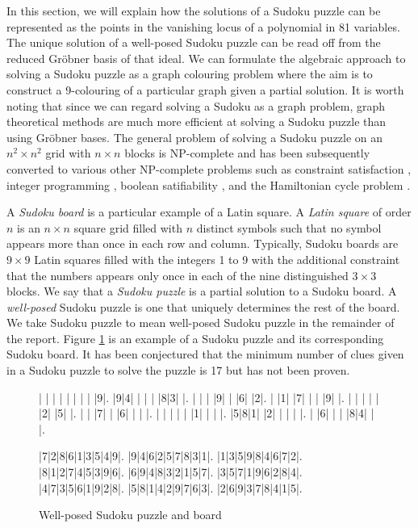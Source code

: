 \documentclass[../main.tex]{subfiles}
\begin{document}
    
    
    In this section, we will explain how the solutions of a Sudoku puzzle can be represented as the points in the vanishing locus of a polynomial in 81 variables. The unique solution of a well-posed Sudoku puzzle can be read off from the reduced Gr\"obner basis of that ideal. We can formulate the algebraic approach to solving a Sudoku puzzle as a graph colouring problem where the aim is to construct a 9-colouring of a particular graph given a partial solution. It is worth noting that since we can regard solving a Sudoku as a graph problem, graph theoretical methods are much more efficient at solving a Sudoku puzzle than using Gr\"obner bases. The general problem of solving a Sudoku puzzle on an $n^2\times n^2$ grid with $n\times n$ blocks is NP-complete and has been subsequently converted to various other NP-complete problems such as constraint satisfaction \citep{simonis2005sudoku}, integer programming \citep{bartlett2008integer}, boolean satifiability \citep{ist2006sudoku}, and the Hamiltonian cycle problem \citep{haythorpe2016reducing}.

    A \emph{Sudoku board} is a particular example of a Latin square. A \emph{Latin square} of order $n$ is an $n\times n$ square grid filled with $n$ distinct symbols such that no symbol appears more than once in each row and column. Typically, Sudoku boards are $9\times 9$ Latin squares filled with the integers 1 to 9 with the additional constraint that the numbers appears only once in each of the nine distinguished $3\times 3$ blocks. We say that a \emph{Sudoku puzzle} is a partial solution to a Sudoku board. A \emph{well-posed} Sudoku puzzle is one that uniquely determines the rest of the board. We take Sudoku puzzle to mean well-posed Sudoku puzzle in the remainder of the report. Figure \ref{board} is an example of a Sudoku puzzle and its corresponding Sudoku board. It has been conjectured that the minimum number of clues given in a Sudoku puzzle to solve the puzzle is 17 but has not been proven.

        \begin{figure}[h!]
            \centering
            \begin{sudoku-block}
                | | | | | | | | |9|.
                |9|4| | | | |8|3| |.
                | | | |9| | |6| |2|.
                | |1| |7| | | |9| |.
                | | | | | |2| |5| |.
                | | |7| | |6| | | |.
                | | | | | |1| | | |.
                |5|8|1| |2| | | | |.
                | |6| | | |8|4| | |.
            \end{sudoku-block}
            \hspace*{10pt}
            \begin{sudoku-block}
                |7|2|8|6|1|3|5|4|9|.
                |9|4|6|2|5|7|8|3|1|.
                |1|3|5|9|8|4|6|7|2|.
                |8|1|2|7|4|5|3|9|6|.
                |6|9|4|8|3|2|1|5|7|.
                |3|5|7|1|9|6|2|8|4|.
                |4|7|3|5|6|1|9|2|8|.
                |5|8|1|4|2|9|7|6|3|.
                |2|6|9|3|7|8|4|1|5|.
            \end{sudoku-block}
            \caption{Well-posed Sudoku puzzle and board}
            \label{board}
        \end{figure}
\end{document}
